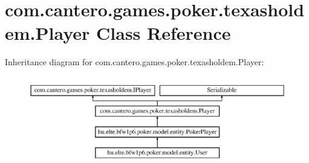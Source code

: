 \hypertarget{classcom_1_1cantero_1_1games_1_1poker_1_1texasholdem_1_1_player}{}\section{com.\+cantero.\+games.\+poker.\+texasholdem.\+Player Class Reference}
\label{classcom_1_1cantero_1_1games_1_1poker_1_1texasholdem_1_1_player}
Inheritance diagram for com.\+cantero.\+games.\+poker.\+texasholdem.\+Player\+:\begin{figure}[H]
\begin{center}
\leavevmode
\includegraphics[height=3.943662cm]{classcom_1_1cantero_1_1games_1_1poker_1_1texasholdem_1_1_player}
\end{center}
\end{figure}
